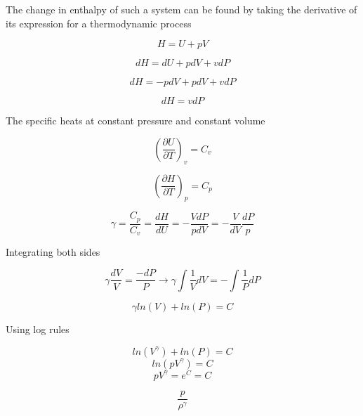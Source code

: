 \documentclass[12pt]{article}
\begin{document}
The change in enthalpy of such a system can be found by taking the derivative of its expression for a thermodynamic process 

\[H = U + pV\]

\[dH = dU + pdV + vdP\]

\[dH = -pdV + pdV + vdP\]

\[dH = vdP\]

The specific heats at constant pressure and constant volume 

\[\left(\frac{\partial U}{\partial T}\right)_v = C_v\]

\[\left(\frac{\partial H}{\partial T}\right)_p = C_p\]

\[\gamma = \frac{C_p}{C_v} = \frac{dH}{dU} = -\frac{VdP}{pdV} = -\frac{V}{dV}\frac{dP}{p}\]

Integrating both sides

\[\gamma \frac{dV}{V} = \frac{-dP}{P} \rightarrow \gamma \int \frac{1}{V} dV = - \int \frac{1}{P} dP\]

\[\gamma ln(V) + ln(P) = C\]

Using log rules

\[ln(V^\gamma) + ln(P) = C\]
 \[ln(pV^\gamma) = C \]
 \[pV^\gamma = e^C = C\]
 
 \[\frac{p}{\rho^\gamma}\]
 





\end{document}
